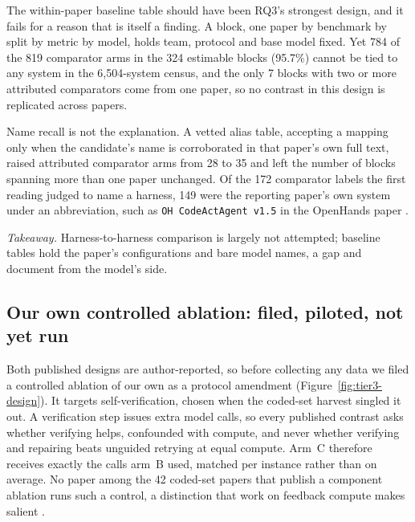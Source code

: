 The within-paper baseline table should have been RQ3's strongest design, and it fails for a reason
that is itself a finding. A block, one paper by benchmark by split by metric by model, holds
team, protocol and base model fixed. Yet 784 of the 819 comparator arms in the 324 estimable blocks
(95.7\%) cannot be tied to any system in the 6,504-system census, and the only 7 blocks with two or
more attributed comparators come from one paper, so no contrast in this design is replicated across
papers.

Name recall is not the explanation. A vetted alias table,
accepting a mapping only when the candidate's name is corroborated in that paper's own full text,
raised attributed comparator arms from 28 to 35 and left the number of blocks spanning more than one
paper unchanged. Of the 172 comparator labels the first reading judged to name a harness, 149 were
the reporting paper's own system under an abbreviation, such as \texttt{OH CodeActAgent v1.5} in the
OpenHands paper \citep{wang2024openhands}.

\emph{Takeaway.} Harness-to-harness comparison is largely not attempted; baseline
tables hold the paper's configurations and bare model names, a gap
\citet{samemodel2026harness} and \citet{scaffoldeffect2026} document from the model's side.

\subsection{Our own controlled ablation: filed, piloted, not yet run}\label{subsec:tier3}

Both published designs are author-reported, so before collecting any data we filed a controlled
ablation of our own as a protocol amendment (Figure~\ref{fig:tier3-design}).
It targets self-verification, chosen when the coded-set harvest singled it out. A verification step
issues extra model calls, so every published contrast asks whether verifying helps, confounded with
compute, and never whether verifying and repairing beats unguided retrying at equal compute. Arm~C
therefore receives exactly the calls arm~B used, matched per instance rather than on average. No paper
among the 42 coded-set papers that publish a component ablation runs such a control, a distinction
that work on feedback compute makes salient \citep{efc2026scaling}.

